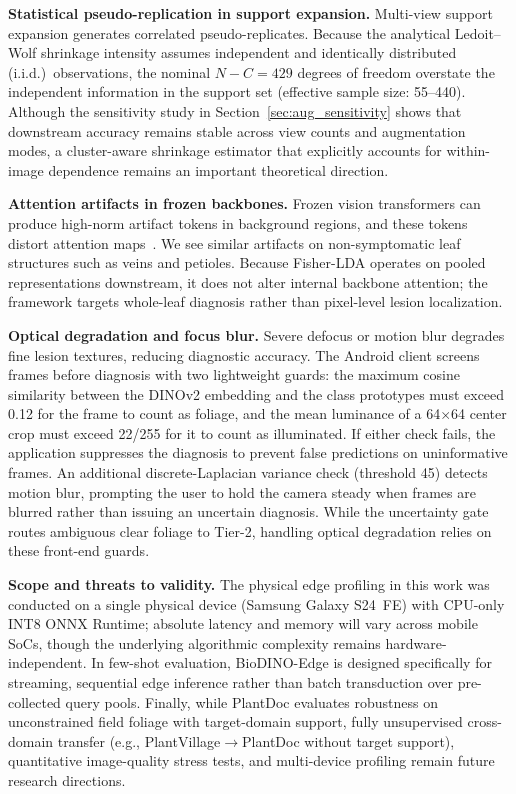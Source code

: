 \textbf{Statistical pseudo-replication in support expansion.} Multi-view support expansion generates correlated pseudo-replicates. Because the analytical Ledoit--Wolf shrinkage intensity assumes independent and identically distributed (i.i.d.)\ observations, the nominal $N-C=429$ degrees of freedom overstate the independent information in the support set (effective sample size: 55--440). Although the sensitivity study in Section~\ref{sec:aug_sensitivity} shows that downstream accuracy remains stable across view counts and augmentation modes, a cluster-aware shrinkage estimator that explicitly accounts for within-image dependence remains an important theoretical direction.

\textbf{Attention artifacts in frozen backbones.} Frozen vision transformers can produce high-norm artifact tokens in background regions, and these tokens distort attention maps~\cite{darcet2024vision}. We see similar artifacts on non-symptomatic leaf structures such as veins and petioles. Because Fisher-LDA operates on pooled representations downstream, it does not alter internal backbone attention; the framework targets whole-leaf diagnosis rather than pixel-level lesion localization.

\textbf{Optical degradation and focus blur.} Severe defocus or motion blur degrades fine lesion textures, reducing diagnostic accuracy. The Android client screens frames before diagnosis with two lightweight guards: the maximum cosine similarity between the DINOv2 embedding and the class prototypes must exceed 0.12 for the frame to count as foliage, and the mean luminance of a 64$\times$64 center crop must exceed 22/255 for it to count as illuminated. If either check fails, the application suppresses the diagnosis to prevent false predictions on uninformative frames. An additional discrete-Laplacian variance check (threshold 45) detects motion blur, prompting the user to hold the camera steady when frames are blurred rather than issuing an uncertain diagnosis. While the uncertainty gate routes ambiguous clear foliage to Tier-2, handling optical degradation relies on these front-end guards.

\textbf{Scope and threats to validity.} The physical edge profiling in this work was conducted on a single physical device (Samsung Galaxy S24~FE) with CPU-only INT8 ONNX Runtime; absolute latency and memory will vary across mobile SoCs, though the underlying algorithmic complexity remains hardware-independent. In few-shot evaluation, BioDINO-Edge is designed specifically for streaming, sequential edge inference rather than batch transduction over pre-collected query pools. Finally, while PlantDoc evaluates robustness on unconstrained field foliage with target-domain support, fully unsupervised cross-domain transfer (e.g., PlantVillage$\rightarrow$PlantDoc without target support), quantitative image-quality stress tests, and multi-device profiling remain future research directions.

